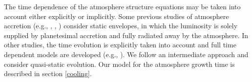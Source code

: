 \documentclass[apj]{emulateapj}
\begin{document}
The time dependence of the atmosphere structure equations may be taken into account either explicitly or implicitly. Some previous studies of atmosphere accretion (e.g., \citealt{stevenson82}, \citealt{wuchterl93}, \citealt{rafikov06}) consider static envelopes, in which the luminosity is solely supplied by planetesimal accretion and fully radiated away by the atmosphere. In other studies, the time evolution is explicitly taken into account and full time dependent models are developed (e.g., \citealt{ikoma00}). We follow an intermediate approach and consider quasi-static evolution. Our model for the atmosphere growth time is described in section \ref{cooling}. 











%
\end{document}
